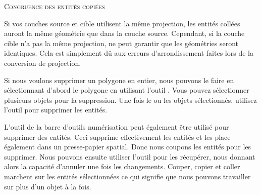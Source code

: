 \begin{Tip}[ht]\caption{\textsc{Congruence des entités copiées}}
Si vos couches source et cible utilisent la même projection, les entités collées auront la même géométrie que dans la couche source. Cependant, si la couche cible n'a pas la même projection, \qg ne peut garantir que les géométries seront identiques. Cela est simplement dû aux erreurs d'arrondissement faites lors de la conversion de projection.
\end{Tip}


Si nous voulons supprimer un polygone en entier, nous pouvons le faire en sélectionnant d'abord le polygone en utilisant l'outil . Vous pouvez sélectionner plusieurs objets pour la suppression. Une fois le ou les objets sélectionnés, utilisez l'outil  pour supprimer les entités.

L'outil  de la barre d'outils numérisation peut également être utilisé pour supprimer des entités. Ceci supprime effectivement les entités et les place également dans un \og presse-papier spatial\fg. Donc nous coupons les entités pour les supprimer. Nous pouvons ensuite utiliser l'outil  pour les récupérer, nous donnant alors la capacité d'annuler une fois les changements. Couper, copier et coller marchent sur les entités sélectionnées ce qui signifie que nous pouvons travailler sur plus d'un objet à la fois.

